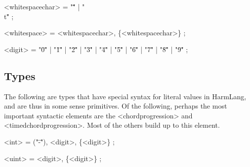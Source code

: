 \documentclass{article}
\begin{document}
\begin{grammar}

<whitespacechar> = "\" \"" | "\"\\t\"" ;

<whitespace> = <whitespacechar>, \{<whitespacechar>\} ;




<digit> = "\"0\"" | "\"1\"" | "\"2\"" | "\"3\"" | "\"4\"" | "\"5\"" | "\"6\"" | "\"7\"" | "\"8\"" | "\"9\"" ;




\end{grammar}

\subsection{Types}

The following are types that have special syntax for literal values in HarmLang, and are thus in some sense primitives.  Of the following, perhaps the most important syntactic elements are the <chordprogression> and <timedchordprogression>.  Most of the others build up to this element.

\begin{grammar}

<int> = ("\"-\""), <digit>, \{<digit>\} ;

<uint> = <digit>, \{<digit>\} ;








\end{grammar}
\end{document}
